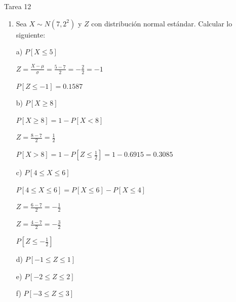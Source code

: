 \documentclass[a4paper, 12pt]{article}
\newcommand{\Aspace}{0.2cm}
\begin{document}
    \newpage
    \vspace{0.3cm}

    \begin{center}
        { \LARGE Tarea 12}
    \end{center}

    \begin{enumerate}
        \item Sea $X \sim N(7, 2^{2})$ y $Z$ con distribución normal estándar. Calcular lo siguiente:
            \vspace{\Aspace} \par
            a) $P[X \leq 5]$
            \vspace{\Aspace}
            \\ { \color{azul} 
                \(
                    Z = \frac{X - \mu}{\sigma}
                    = \frac{5 - 7}{2}
                    = -\frac{2}{2}
                    = -1
                \) \par
                \( P[Z \leq -1] = 0{.}1587 \)
            }

            \vspace{\Aspace} \par
            b) $P[X \geq 8]$
            \vspace{\Aspace}
            \\ { \color{azul} 
                \( P[X \geq 8] = 1 - P[X < 8] \) \par
                \( Z = \frac{8 - 7}{2} = \frac{1}{2} \) \par
                \( P[X > 8] = 1 - P\left[Z \leq \frac{1}{2}\right] = 1 - 0{.}6915 = 0{.}3085 \)
            }

            \vspace{\Aspace} \par
            c) $P[4 \leq X \leq 6]$
            \vspace{\Aspace}
            \\ { \color{azul} 
                \( P[4 \leq X \leq 6] = P[X \leq 6] - P[X \leq 4] \) \par
                \( Z = \frac{6 - 7}{2} = -\frac{1}{2}\) \par
                \( Z = \frac{4 - 7}{2} = -\frac{3}{2}\) \par
                \( P[Z \leq -\frac{1}{2}] \)
            }

            \vspace{\Aspace} \par
            d) $P[-1 \leq Z \leq 1]$
            \vspace{\Aspace}
            \\ { \color{azul}  }

            \vspace{\Aspace} \par
            e) $P[-2 \leq Z \leq 2]$
            \vspace{\Aspace}
            \\ { \color{azul}  }

            \vspace{\Aspace} \par
            f) $P[-3 \leq Z \leq 3]$
            \vspace{\Aspace}
            \\ { \color{azul}  }
    \end{enumerate}
\end{document}

